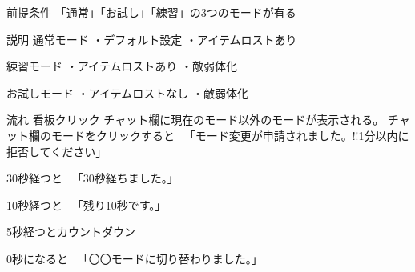 前提条件
「通常」「お試し」「練習」の3つのモードが有る

説明
通常モード
・デフォルト設定
・アイテムロストあり

練習モード
・アイテムロストあり
・敵弱体化

お試しモード
・アイテムロストなし
・敵弱体化

流れ
看板クリック
チャット欄に現在のモード以外のモードが表示される。
チャット欄のモードをクリックすると
　「モード変更が申請されました。!!1分以内に拒否してください」

30秒経つと
　「30秒経ちました。」

10秒経つと
　「残り10秒です。」

5秒経つとカウントダウン

0秒になると
　「〇〇モードに切り替わりました。」